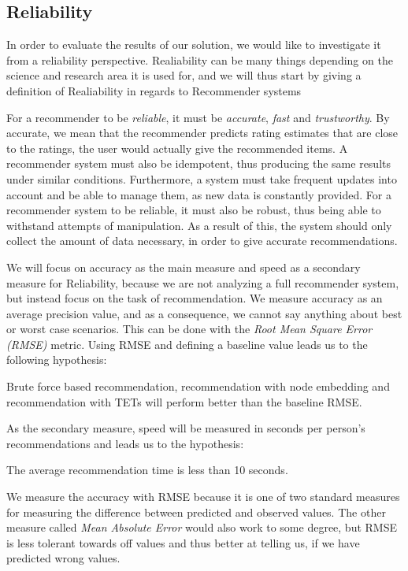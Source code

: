 \subsection{Reliability}\label{Subsec:Reliability_definition}

In order to evaluate the results of our solution, we would like to investigate it from a reliability perspective.
Realiability can be many things depending on the science and research area it is used for, and we will thus start by giving a definition of Realiability in regards to Recommender systems

For a recommender to be \textit{reliable}, it must be \textit{accurate}, \textit{fast} and \textit{trustworthy}.
By accurate, we mean that the recommender predicts rating estimates that are close to the ratings, the user would actually give the recommended items.
A recommender system must also be idempotent, thus producing the same results under similar conditions. Furthermore, a system must take frequent updates into account and be able to manage them, as new data is constantly provided.
For a recommender system to be reliable, it must also be robust, thus being able to withstand attempts of manipulation. As a result of this, the system should only collect the amount of data necessary, in order to give accurate recommendations.

We will focus on accuracy as the main measure and speed as a secondary measure for Reliability, because we are not analyzing a full recommender system, but instead focus on the task of recommendation.
We measure accuracy as an average precision value, and as a consequence, we cannot say anything about best or worst case scenarios. This can be done with the \textit{Root Mean Square Error (RMSE)} metric. Using RMSE and defining a baseline value leads us to the following hypothesis:

\begin{hypothesis}\label{RMSE_hypothesis}
  Brute force based recommendation, recommendation with node embedding and recommendation with TETs will perform better than the baseline RMSE.
\end{hypothesis}

As the secondary measure, speed will be measured in seconds per person's recommendations and leads us to the hypothesis:
\begin{hypothesis}\label{Speed_hypothesis}
  The average recommendation time is less than 10 seconds.
\end{hypothesis}

We measure the accuracy with RMSE because it is one of two standard measures for measuring the difference between predicted and observed values. The other measure called \textit{Mean Absolute Error} would also work to some degree, but RMSE is less tolerant towards off values and thus better at telling us, if we have predicted wrong values.
